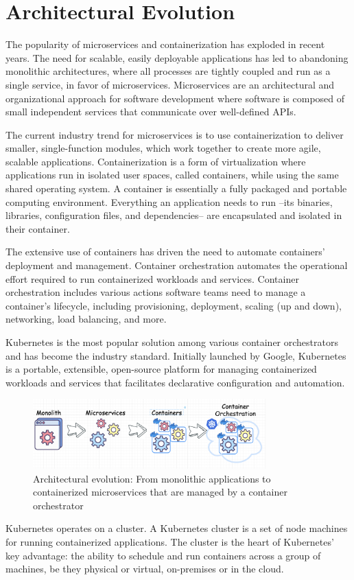 \section{Architectural Evolution}

The popularity of microservices and containerization has exploded in recent
years. The need for scalable, easily deployable applications has led to 
abandoning monolithic architectures, where all processes are tightly coupled
and run as a single service, in favor of microservices. Microservices are an
architectural and organizational approach for software development where software
is composed of small independent services that communicate over well-defined
APIs.

The current industry trend for microservices is to use containerization to
deliver smaller, single-function modules, which work together to create more
agile, scalable applications. Containerization is a form of virtualization where
applications run in isolated user spaces, called containers, while using the
same shared operating system. A container is essentially a fully packaged and
portable computing environment. Everything an application needs to run --its
binaries, libraries, configuration files, and dependencies-- are encapsulated and
isolated in their container.

The extensive use of containers has driven the need to automate containers'
deployment and management. Container orchestration automates the operational
effort required to run containerized workloads and services. Container
orchestration includes various actions software teams need to manage a
container's lifecycle, including provisioning, deployment, scaling (up and
down), networking, load balancing, and more.

Kubernetes is the most popular solution among various container orchestrators
and has become the industry standard. Initially launched by Google, Kubernetes
is a portable, extensible, open-source platform for managing containerized
workloads and services that facilitates declarative configuration and
automation.

\begin{figure}
    \centering
    \includegraphics[width=0.8\textwidth]{resources/containerization.png}
    \caption{Architectural evolution: From monolithic applications to containerized microservices that are managed by a container orchestrator}
\end{figure}

Kubernetes operates on a cluster. A Kubernetes cluster is a set of node machines
for running containerized applications. The cluster is the heart of Kubernetes'
key advantage: the ability to schedule and run containers across a group of
machines, be they physical or virtual, on-premises or in the cloud.

